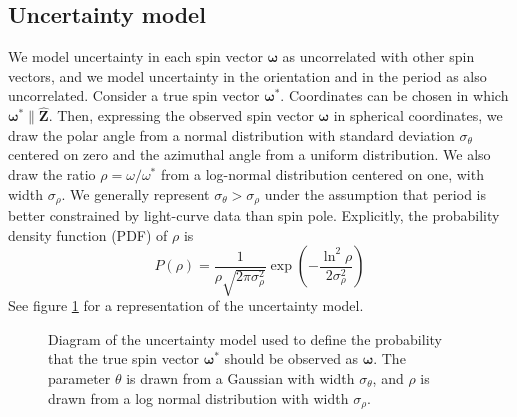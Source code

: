 \documentclass[fleqn,usenatbib]{mnras}
\newcommand{\unit}[1]{\bm{\hat{#1}}}
\newcommand{\parens}[1]{\left( #1 \right)}
\begin{document}
\subsection{Uncertainty model}
\label{sec:uncertainty}

We model uncertainty in each spin vector $\bm \omega$ as uncorrelated with other spin vectors, and we model uncertainty in the orientation and in the period as also uncorrelated. Consider a true spin vector $\bm \omega^*$. Coordinates can be chosen in which $\bm \omega^* \parallel \unit Z$. Then, expressing the observed spin vector $\bm \omega$ in spherical coordinates, we draw the polar angle from a normal distribution with standard deviation $\sigma_\theta$ centered on zero and the azimuthal angle from a uniform distribution. We also draw the ratio $\rho=\omega/\omega^*$ from a log-normal distribution centered on one, with width $\sigma_\rho$. We generally represent $\sigma_\theta > \sigma_\rho$ under the assumption that period is better constrained by light-curve data than spin pole. Explicitly, the probability density function (PDF) of $\rho$ is 
\begin{equation}
  P(\rho) = \frac{1}{\rho\sqrt{2\pi \sigma_\rho^2}} \exp\parens{-\frac{\ln^2\rho}{2\sigma_\rho^2}}
\end{equation}
See figure \ref{fig:uncertainty-model} for a representation of the uncertainty model.

\begin{figure}
  \centering
  \caption{Diagram of the uncertainty model used to define the probability that the true spin vector $\bm \omega^*$ should be observed as $\bm \omega$. The parameter $\theta$ is drawn from a Gaussian with width $\sigma_\theta$, and $\rho$ is drawn from a log normal distribution with width $\sigma_\rho$.}
  \label{fig:uncertainty-model}
\end{figure}
\end{document}
